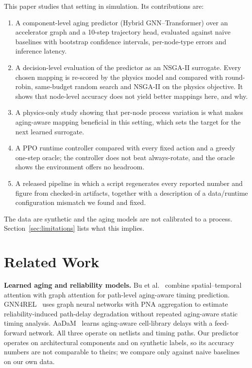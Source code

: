 \documentclass[conference]{IEEEtran}
\begin{document}
This paper studies that setting in simulation. Its contributions are:
\begin{enumerate}
    \item A component-level aging predictor (Hybrid GNN--Transformer) over an accelerator graph and a 10-step trajectory head, evaluated against naive baselines with bootstrap confidence intervals, per-node-type errors and inference latency.
    \item A decision-level evaluation of the predictor as an NSGA-II surrogate. Every chosen mapping is re-scored by the physics model and compared with round-robin, same-budget random search and NSGA-II on the physics objective. It shows that node-level accuracy does not yield better mappings here, and why.
    \item A physics-only study showing that per-node process variation is what makes aging-aware mapping beneficial in this setting, which sets the target for the next learned surrogate.
    \item A PPO runtime controller compared with every fixed action and a greedy one-step oracle; the controller does not beat always-rotate, and the oracle shows the environment offers no headroom.
    \item A released pipeline in which a script regenerates every reported number and figure from checked-in artifacts, together with a description of a data/runtime configuration mismatch we found and fixed.
\end{enumerate}

The data are synthetic and the aging models are not calibrated to a process. Section~\ref{sec:limitations} lists what this implies.

\section{Related Work}
\label{sec:related}

\textbf{Learned aging and reliability models.} Bu et al.~\cite{bu2024multiview} combine spatial--temporal attention with graph attention for path-level aging-aware timing prediction. GNN4REL~\cite{alrahis2022gnn4rel} uses graph neural networks with PNA aggregation to estimate reliability-induced path-delay degradation without repeated aging-aware static timing analysis. AaDaM~\cite{ebrahimipour2020aadam} learns aging-aware cell-library delays with a feed-forward network. All three operate on netlists and timing paths. Our predictor operates on architectural components and on synthetic labels, so its accuracy numbers are not comparable to theirs; we compare only against naive baselines on our own data.
\end{document}

